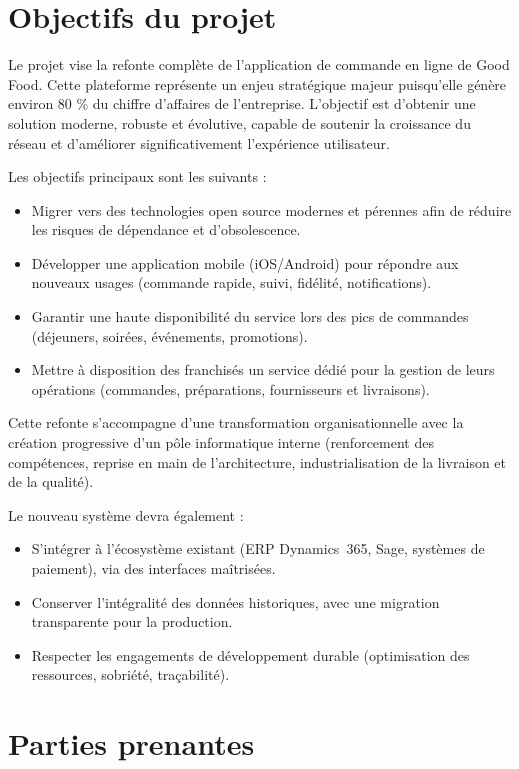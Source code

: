 \section{Objectifs du projet}

Le projet vise la refonte complète de l’application de commande en ligne de Good Food. Cette plateforme représente un enjeu stratégique majeur puisqu’elle génère environ 80 \% du chiffre d’affaires de l’entreprise. L’objectif est d’obtenir une solution moderne, robuste et évolutive, capable de soutenir la croissance du réseau et d’améliorer significativement l’expérience utilisateur.

Les objectifs principaux sont les suivants :
\begin{itemize}
    \item Migrer vers des technologies open source modernes et pérennes afin de réduire les risques de dépendance et d’obsolescence.
    \item Développer une application mobile (iOS/Android) pour répondre aux nouveaux usages (commande rapide, suivi, fidélité, notifications).
    \item Garantir une haute disponibilité du service lors des pics de commandes (déjeuners, soirées, événements, promotions).
    \item Mettre à disposition des franchisés un service dédié pour la gestion de leurs opérations (commandes, préparations, fournisseurs et livraisons).
\end{itemize}

Cette refonte s’accompagne d’une transformation organisationnelle avec la création progressive d’un pôle informatique interne (renforcement des compétences, reprise en main de l’architecture, industrialisation de la livraison et de la qualité).

Le nouveau système devra également :
\begin{itemize}
    \item S’intégrer à l’écosystème existant (ERP Dynamics~365, Sage, systèmes de paiement), via des interfaces maîtrisées.
    \item Conserver l’intégralité des données historiques, avec une migration transparente pour la production.
    \item Respecter les engagements de développement durable (optimisation des ressources, sobriété, traçabilité).
\end{itemize}

\section{Parties prenantes}

